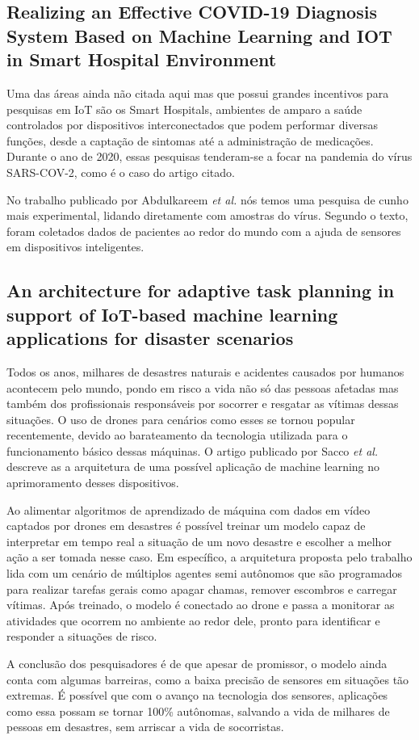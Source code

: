 \documentclass[12pt]{article}
\begin{document}
\subsection{Realizing an Effective COVID-19 Diagnosis System Based on Machine Learning and IOT in Smart Hospital Environment \cite{hameed}}

Uma das áreas ainda não citada aqui mas que possui grandes incentivos para pesquisas em IoT são os Smart Hospitals, ambientes de amparo a saúde controlados por dispositivos
interconectados que podem performar diversas funções, desde a captação de sintomas até a administração de medicações. Durante o ano de 2020, essas pesquisas tenderam-se a focar na pandemia
do vírus SARS-COV-2, como é o caso do artigo citado.

No trabalho publicado por Abdulkareem \emph{et al.} nós temos uma pesquisa de cunho mais experimental, lidando diretamente com amostras do vírus. Segundo o texto, foram coletados dados de pacientes
ao redor do mundo com a ajuda de sensores em dispositivos inteligentes.

\subsection{An architecture for adaptive task planning in support of IoT-based machine learning applications for disaster scenarios \cite{sacco}}

Todos os anos, milhares de desastres naturais e acidentes causados por humanos acontecem pelo mundo, pondo em risco a vida não só das pessoas afetadas mas também dos
profissionais responsáveis por socorrer e resgatar as vítimas dessas situações. O uso de drones para cenários como esses se tornou popular recentemente, devido ao barateamento da tecnologia
utilizada para o funcionamento básico dessas máquinas. O artigo publicado por Sacco \emph{et al.} descreve as a arquitetura de uma possível aplicação de machine learning no aprimoramento desses dispositivos.

Ao alimentar algoritmos de aprendizado de máquina com dados em vídeo captados por drones em desastres é possível treinar um modelo capaz de interpretar em tempo real a situação
de um novo desastre e escolher a melhor ação a ser tomada nesse caso. Em específico, a arquitetura proposta pelo trabalho lida com um cenário de múltiplos agentes semi autônomos
que são programados para realizar tarefas gerais como apagar chamas, remover escombros e carregar vítimas. Após treinado, o modelo é conectado ao drone e passa a monitorar as atividades
que ocorrem no ambiente ao redor dele, pronto para identificar e responder a situações de risco.

A conclusão dos pesquisadores é de que apesar de promissor, o modelo ainda conta com algumas barreiras, como a baixa precisão de sensores em situações tão extremas. É possível que com o avanço
na tecnologia dos sensores, aplicações como essa possam se tornar 100\% autônomas, salvando a vida de milhares de pessoas em desastres, sem arriscar a vida de socorristas.

\nocite{*}
\medskip



\end{document}
